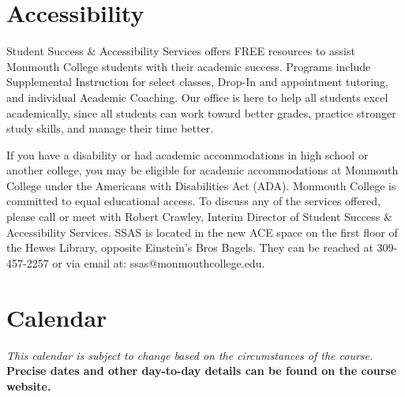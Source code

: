 \documentclass[10pt]{article}
\begin{document}
\section{Accessibility}

Student Success \& Accessibility Services offers FREE resources to assist Monmouth College students with their academic success. Programs include Supplemental Instruction for select classes, Drop-In and appointment tutoring, and individual Academic Coaching. Our office is here to help all students excel academically, since all students can work toward better grades, practice stronger study skills, and manage their time better.

If you have a disability or had academic accommodations in high school or another college, you may be eligible for academic accommodations at Monmouth College under the Americans with Disabilities Act (ADA). Monmouth College is committed to equal educational access. To discuss any of the services offered, please call or meet with Robert Crawley, Interim Director of Student Success \& Accessibility Services.  SSAS is located in the new ACE space on the first floor of the Hewes Library, opposite Einstein’s Bros Bagels. They can be reached at 309-457-2257 or via email at: ssas@monmouthcollege.edu.



\section{Calendar}

\textit{This calendar is subject to change based on the circumstances of the course.} \textbf{Precise dates and other day-to-day details can be found on the course website.}
\end{document}
